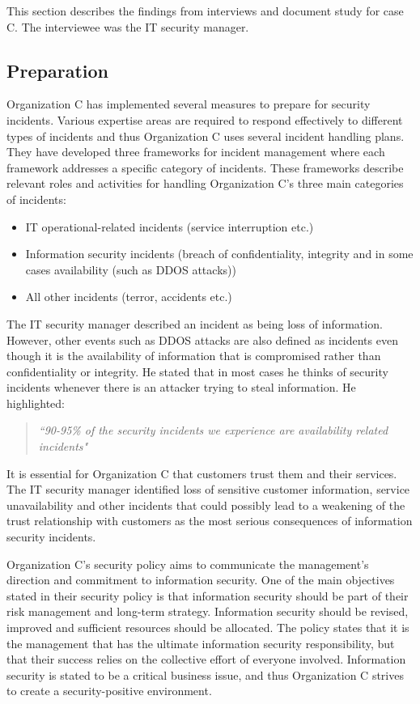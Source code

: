This section describes the findings from interviews and document study for case C. The interviewee was the IT security manager. 

\subsection{Preparation}
Organization C has implemented several measures to prepare for security incidents. Various expertise areas are required to respond effectively to different types of incidents and thus Organization C uses several incident handling plans. They have developed three frameworks for incident management where each framework addresses a specific category of incidents. These frameworks describe relevant roles and activities for handling Organization C's three main categories of incidents:

\begin{itemize}
\item IT operational-related incidents (service interruption etc.)
\item Information security incidents (breach of confidentiality, integrity and in some cases availability (such as DDOS attacks))
\item All other incidents (terror, accidents etc.)
\end{itemize}
 
The IT security manager described an incident as being loss of information. However, other events such as DDOS attacks are also defined as incidents even though it is the availability of information that is compromised rather than confidentiality or integrity. He stated that in most cases he thinks of security incidents whenever there is an attacker trying to steal information. He highlighted:

\begin{quote}
\textit{``90-95\% of the security incidents we experience are availability related incidents"}
\end{quote} 
 
It is essential for Organization C that customers trust them and their services. The IT security manager identified loss of sensitive customer information, service unavailability and other incidents that could possibly lead to a weakening of the trust relationship with customers as the most serious consequences of information security incidents. 

Organization C's security policy aims to communicate the management's direction and commitment to information security. One of the main objectives stated in their security policy is that information security should be part of their risk management and long-term strategy. Information security should be revised, improved and sufficient resources should be allocated. The policy states that it is the management that has the ultimate information security responsibility, but that their success relies on the collective effort of everyone involved. Information security is stated to be a critical business issue, and thus Organization C strives to create a security-positive environment.


